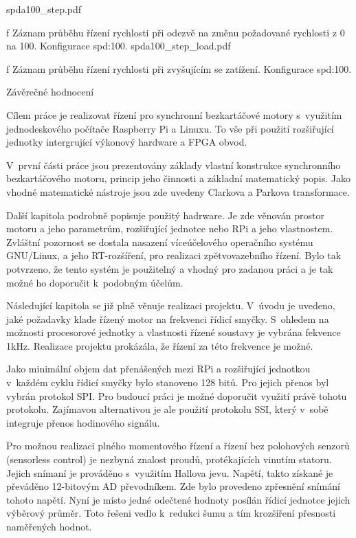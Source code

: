  \medskip {}
\picw=14.5cm \cinspic spda100_step.pdf
\caption/f Záznam průběhu řízení rychlosti při odezvě na změnu požadované rychlosti z 0 na 100. Konfigurace spd:100.
\medskip 
 \medskip {}
\picw=14.5cm \cinspic spda100_step_load.pdf
\caption/f Záznam průběhu řízení rychlosti při zvyšujícím se zatížení. Konfigurace spd:100.
\medskip 
 

\sec Závěrečné hodnocení
 
Cílem  práce  je  realizovat řízení pro  synchronní bezkartáčové motory s~využitím jednodeskového počítače Raspberry Pi a Linuxu. To vše při použití rozšiřující jednotky intergrující výkonový hardware a FPGA obvod.
  
  V~první  části  práce  jsou  prezentovány  základy  vlastní konstrukce synchronního  bezkartáčového motoru,  princip  jeho  činnosti  a základní matematický popis. Jako vhodné matematické  nástroje jsou zde uvedeny Clarkova a Parkova transformace.
  
  Další kapitola podrobně popisuje použitý hadrware. Je zde věnován prostor motoru a jeho parametrům, rozšiřující jednotce nebo RPi a jeho vlastnostem. Zvláštní pozornost se dostala nasazení víceúčelového operačního systému GNU/Linux, a jeho RT-rozšíření, pro realizaci zpětvovazebního řízení. Bylo tak potvrzeno, že tento systém je použitelný a vhodný pro zadanou práci a je tak možné ho doporučit k~podobným účelům. 
  
  Následující kapitola se již plně věnuje realizaci projektu. V~úvodu je uvedeno, jaké požadavky klade řízený motor na frekvenci řídicí smyčky. S~ohledem na možnosti procesorové jednotky a vlastnosti řízené soustavy je vybrána fekvence 1kHz. Realizace projektu prokázála, že řízení za této frekvence je možné. 
  
  Jako minimální objem dat přenášených mezi RPi a rozšiřující jednotkou v~každém cyklu řídicí smyčky bylo stanoveno 128 bitů. Pro jejich přenos byl vybrán protokol SPI. Pro budoucí práci je možné doporučit využití právě tohotu protokolu. Zajímavou alternativou je ale použití protokolu SSI, který v~sobě integruje přenos hodinového signálu.
  
  Pro možnou realizaci plného momentového řízení a řízení bez polohových senzorů (sensorless control) je nezbyná znalost proudů, protékajících vinutím statoru. Jejich snímaní je prováděno s~využitím Hallova jevu. Napětí, takto získané je převáděno 12-bitovým AD převodníkem. Zde bylo provedeno zpřesnění snímání tohoto napětí. Nyní je místo jedné odečtené hodnoty posílán řídicí jednotce jejich výběrový průměr. Toto řešeni vedlo k~redukci šumu a tím krozšíření přesnosti naměřených hodnot.
  

